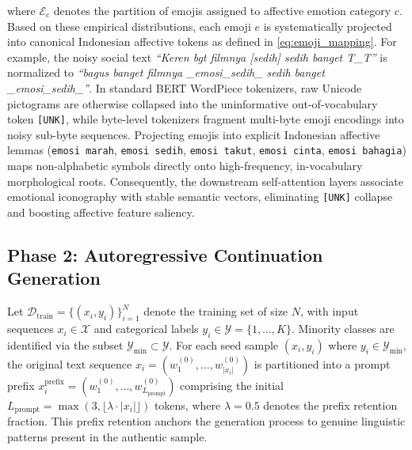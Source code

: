 \documentclass{ieeeaccess}
\begin{document}
where $\mathcal{E}_c$ denotes the partition of emojis assigned to affective emotion category $c$. Based on these empirical distributions, each emoji $e$ is systematically projected into canonical Indonesian affective tokens as defined in \eqref{eq:emoji_mapping}. For example, the noisy social text \textit{``Keren bgt filmnya [sedih] sedih banget T\_T''} is normalized to \textit{``bagus banget filmnya \_emosi\_sedih\_ sedih banget \_emosi\_sedih\_''}. In standard BERT WordPiece tokenizers, raw Unicode pictograms are otherwise collapsed into the uninformative out-of-vocabulary token \texttt{[UNK]}, while byte-level tokenizers fragment multi-byte emoji encodings into noisy sub-byte sequences. Projecting emojis into explicit Indonesian affective lemmas (\texttt{emosi marah}, \texttt{emosi sedih}, \texttt{emosi takut}, \texttt{emosi cinta}, \texttt{emosi bahagia}) maps non-alphabetic symbols directly onto high-frequency, in-vocabulary morphological roots. Consequently, the downstream self-attention layers associate emotional iconography with stable semantic vectors, eliminating \texttt{[UNK]} collapse and boosting affective feature saliency.

\subsection{Phase 2: Autoregressive Continuation Generation}
\label{subsec:phase2}

Let $\mathcal{D}_{\text{train}} = \{(x_i, y_i)\}_{i=1}^{N}$ denote the training set of size $N$, with input sequences $x_i \in \mathcal{X}$ and categorical labels $y_i \in \mathcal{Y} = \{1, \dots, K\}$. Minority classes are identified via the subset $\mathcal{Y}_{\text{min}} \subset \mathcal{Y}$. For each seed sample $(x_i, y_i)$ where $y_i \in \mathcal{Y}_{\text{min}}$, the original text sequence $x_i = (w_1^{(0)}, \dots, w_{|x_i|}^{(0)})$ is partitioned into a prompt prefix $x_i^{\text{prefix}} = (w_1^{(0)}, \dots, w_{L_{\text{prompt}}}^{(0)})$ comprising the initial $L_{\text{prompt}} = \max(3, \lfloor \lambda \cdot |x_i| \rfloor)$ tokens, where $\lambda = 0.5$ denotes the prefix retention fraction. This prefix retention anchors the generation process to genuine linguistic patterns present in the authentic sample.
\end{document}
